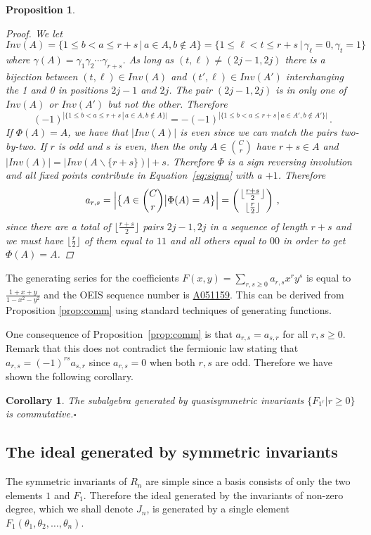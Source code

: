 \documentclass[11pt]{amsart}
\newtheorem{prop}[theorem]{Proposition}
\newtheorem{cor}[theorem]{Corollary}
\theoremstyle{definition}
\numberwithin{equation}{section}
\newcommand{\mike}[1]{\todo[size=\tiny,color=lime!30]{#1 \\ \hfill --- Mike}}
\begin{document}
\begin{prop}
\begin{proof}
We let
 $$Inv(A)=\{1\le b<a\le r+s\,|\,a\in A, b\not\in A\}=\{1\le \ell<t\le r+s\,|\,\gamma_\ell=0,\gamma_t=1 \}\,$$
 where $\gamma(A)=\gamma_1\gamma_2\cdots\gamma_{r+s}$.
As long as $(t,\ell)\ne(2j-1,2j)$ there is a bijection between $(t,\ell)\in Inv(A)$ and
$(t',\ell)\in Inv(A')$ interchanging the 1 and 0 in positions $2j-1$ and $2j$.
The pair $(2j-1,2j)$ is in only one of $Inv(A)$ or $Inv(A')$ but not the other. Therefore
$$(-1)^{|\{1\le b<a\le r+s\,|\,a\in A, b\not\in A\}|} = -(-1)^{|\{1\le b<a\le r+s\,|\,a\in A', b\not\in A'\}|}\,.$$
If $\Phi(A)=A$, we have that $|Inv(A)|$ is even since we can match the pairs two-by-two.
If $r$ is odd and $s$ is even, then the only $A \in \binom{C}{r}$ have
$r+s \in A$ and $|Inv(A)| = |Inv(A \backslash \{ r+s \})| + s$.
Therefore $\Phi$ is a sign reversing involution and all fixed points contribute
in Equation~\eqref{eq:signa} with a $+1$. Therefore
$$a_{r,s}=\Big|\big\{ A\in {C\choose r}\big| \Phi(A)=A\big\}\Big|=\left({\lfloor \frac{r+s}{2} \rfloor \atop \lfloor \frac{r}{2} \rfloor}\right)\,,$$
since there are a total of $\lfloor \frac{r+s}{2} \rfloor$ pairs $2j-1,2j$
in a sequence of length $r+s$ and we must have $\lfloor \frac{r}{2} \rfloor$ of them equal to $11$
and all others equal to $00$ in order to get $\Phi(A)=A$.
\end{proof}
\end{prop}

The generating series for the coefficients $F(x,y) = \sum_{r,s \ge 0} a_{r,s} x^{r}y^{s}$ is
equal to $\frac{1 + x + y}{1 - x^{2} - y^{2}}$
and the OEIS \cite{OEIS} sequence number is \href{https://oeis.org/A051159}{A051159}.
This can be derived from Proposition \ref{prop:comm} using standard techniques of generating functions.
\mike{TODO: add comment to OEIS sequence}

One consequence of Proposition~\ref{prop:comm} is that $a_{r,s}=a_{s,r}$ for all $r,s\ge 0$. Remark that this does not contradict the fermionic law stating that $a_{r,s}=(-1)^{rs}a_{s,r}$ since $a_{r,s}=0$ when both $r,s$ are odd. Therefore we have shown the following corollary.

\begin{cor}
The subalgebra generated by quasisymmetric invariants $\{F_{1^r}|r\ge 0\}$ is commutative.\hfill$\square$
\end{cor}

\subsection{The ideal generated by symmetric invariants}
The symmetric invariants of $R_n$ are simple since a basis consists of only the two
elements $1$ and $F_1$.  Therefore the ideal generated by the invariants of non-zero
degree, which we shall denote $J_n$, is generated by a single element
$F_1(\theta_1,\theta_2, \ldots, \theta_n)$.
\end{document}
